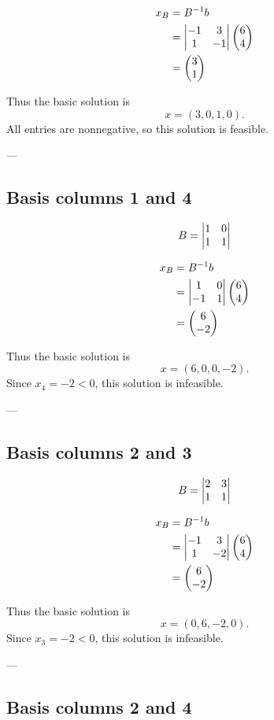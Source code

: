 \begin{align*}
	x_B &= B^{-1}b \\
	&= \m{v}{-1&3\\1&-1} \m{p}{6\\4} \\
	&= \m{p}{3\\1}
\end{align*}

Thus the basic solution is
\[
	x = (3, 0, 1, 0).
\]
All entries are nonnegative, so this solution is feasible.

---

\subsection*{Basis columns 1 and 4}

\[
	B = \m{v}{1&0\\1&1}
\]

\begin{align*}
	x_B &= B^{-1}b \\
	&= \m{v}{1&0\\-1&1} \m{p}{6\\4} \\
	&= \m{p}{6\\-2}
\end{align*}

Thus the basic solution is
\[
	x = (6, 0, 0, -2).
\]
Since $x_4 = -2 < 0$, this solution is infeasible.

---

\subsection*{Basis columns 2 and 3}

\[
	B = \m{v}{2&3\\1&1}
\]

\begin{align*}
	x_B &= B^{-1}b \\
	&= \m{v}{-1&3\\1&-2} \m{p}{6\\4} \\
	&= \m{p}{6\\-2}
\end{align*}

Thus the basic solution is
\[
	x = (0, 6, -2, 0).
\]
Since $x_3 = -2 < 0$, this solution is infeasible.

---

\subsection*{Basis columns 2 and 4}

